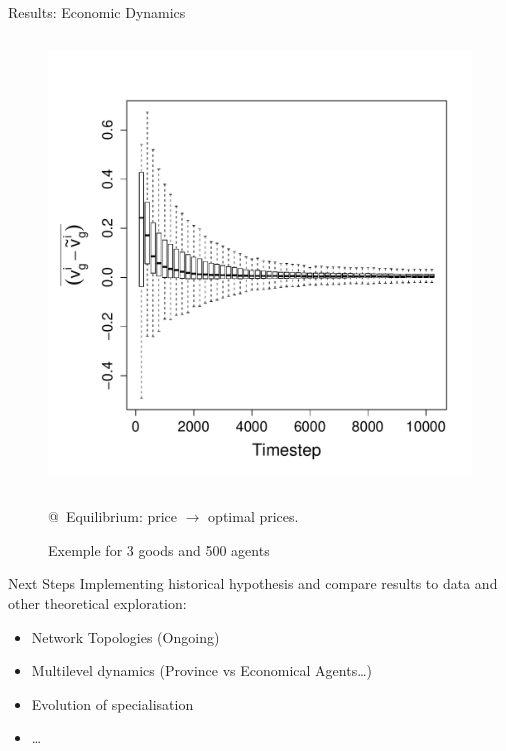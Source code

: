 \documentclass[12pt, handout=show,notes=show]{beamer}
\begin{document}
\begin{frame}{Results: Economic Dynamics}
	\begin{figure}
	    \caption{Exemple for 3 goods and 500 agents}
	    \begin{columns}
		\includegraphics[height=\textwidth]{images/ClearingPriceDistanceEvolutionForTrade-G3N500.pdf}\\
	    \end{columns}
		@~Equilibrium: price $\rightarrow$ optimal prices.
	\end{figure}
	
\end{frame}

\begin{frame}{Next Steps}
    Implementing historical hypothesis and compare results to data and other theoretical exploration:

	\begin{itemize}
		\item Network Topologies (Ongoing)
			\vfil
		\item	Multilevel dynamics (Province vs Economical Agents\ldots)
			\vfil
		\item	Evolution of specialisation 
			\vfil
		\item	\ldots
	\end{itemize}
\end{frame}
\end{document}
